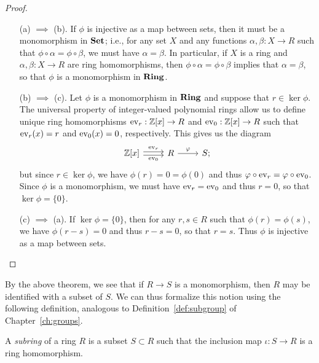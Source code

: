 \begin{proof}\(\)

    \begin{enumerate}[wide]
        \item[(a) \(\implies\) (b).] If \(\phi\) is injective as a map between
        sets, then it must be a monomorphism in \(\mathbf{Set}\); i.e., for any set
        \(X\) and any functions \(\alpha, \beta: X \to R\) such that \(\phi
        \circ \alpha = \phi \circ \beta\), we must have \(\alpha = \beta\). In
        particular, if \(X\) is a ring and \(\alpha, \beta: X \to R\) are ring
        homomorphisms, then \(\phi \circ \alpha = \phi \circ \beta\) implies
        that \(\alpha = \beta\), so that \(\phi\) is a monomorphism in
        \(\mathbf{Ring}\).
        
        \item[(b) \(\implies\) (c).] Let \(\phi\) is a monomorphism in \(\mathbf{Ring}\)
        and suppose that \(r \in \ker \phi\). The universal property of
        integer-valued polynomial rings allow us to define unique ring
        homomorphisms \(\operatorname{ev}_r : \mathbb{Z}[x] \to R\) and \(\operatorname{ev}_0: \mathbb{Z}[x] \to R\) such
        that \(\operatorname{ev}_r(x) = r\) and \(\operatorname{ev}_0(x) = 0\), respectively. This gives us
        the diagram
        \[
            \begin{tikzcd}
                \Z[x]\arrow[r,shift left=2pt,"\ev_r"]\arrow[r,shift right=2pt,"\ev_0", swap] &  R \arrow[r,"\phi"] & S;
            \end{tikzcd}
        \]
        but since \(r \in \ker \phi\), we have \(\phi(r) = 0 = \phi(0)\) and
        thus \(\varphi \circ \operatorname{ev}_r = \varphi \circ \operatorname{ev}_0\). Since \(\phi\) is a
        monomorphism, we must have \(\operatorname{ev}_r = \operatorname{ev}_0\) and thus \(r = 0\), so that
        \(\ker \phi = \{0\}\).

        \item[(c) \(\implies\) (a).] If \(\ker \phi = \{0\}\), then for any \(r,
        s \in R\) such that \(\phi(r) = \phi(s)\), we have \(\phi(r - s) = 0\)
        and thus \(r - s = 0\), so that \(r = s\). Thus \(\phi\) is injective as
        a map between sets.
    \end{enumerate}
\end{proof}

By the above theorem, we see that if \(R \to S\) is a monomorphism, then \(R\)
may be identified with a subset of \(S\). We can thus formalize this notion
using the following definition, analogous to Definition~\ref{def:subgroup} of
Chapter~\ref{ch:groups}.

\begin{definition}
    A \emph{subring} of a ring \(R\) is a subset \(S \subset R\) such that the
    inclusion map \(\iota: S \to R\) is a ring homomorphism. 
\end{definition}

